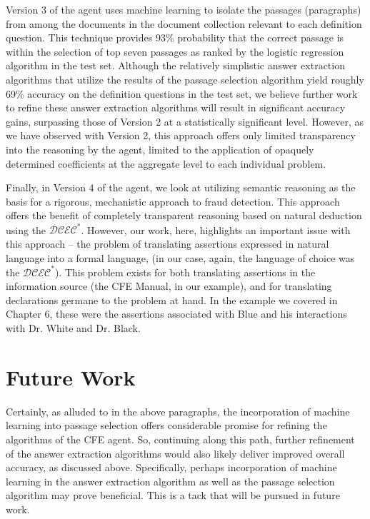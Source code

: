 Version 3 of the agent uses machine learning to isolate the passages (paragraphs) from among the documents in the document collection relevant to each definition question. This technique provides 93\% probability that the correct passage is within the selection of top seven passages as ranked by the logistic regression
algorithm in the test set. Although the relatively simplistic answer extraction algorithms that utilize the results of the passage selection algorithm yield roughly 69\% accuracy on the definition questions in the test set, we believe further work to refine these answer extraction algorithms will result in significant accuracy gains, surpassing those of Version 2 at a statistically significant level. However, as we have observed with Version 2, this approach offers only limited transparency into the reasoning by the agent, limited to the application of opaquely determined coefficients at the aggregate level to each individual problem.

Finally, in Version 4 of the agent, we look at utilizing semantic reasoning as the basis for a rigorous, mechanistic approach to fraud detection.  This approach offers the benefit of completely transparent reasoning based on natural deduction using the $\mathcal{DCEC}^\ast$.  However, our work, here, highlights an important issue with this approach -- the problem of translating assertions expressed in natural language into a formal language, (in our case, again, the language of choice was the $\mathcal{DCEC}^\ast$).  This problem exists for both translating assertions in the information source (the CFE Manual, in our example), and for translating declarations germane to the problem at hand. In the example we covered in Chapter 6, these were the assertions associated with Blue and his interactions with Dr. White and Dr. Black.

\section{Future Work}

Certainly, as alluded to in the above paragraphs, the incorporation of machine learning into passage selection offers considerable promise for refining the algorithms of the CFE agent. So, continuing along this path, further refinement of the answer extraction algorithms would also likely deliver improved overall accuracy, as discussed above. Specifically, perhaps incorporation of machine learning in the answer extraction algorithm as well as the passage selection algorithm may prove beneficial. This is a tack that will be pursued in future work.  

